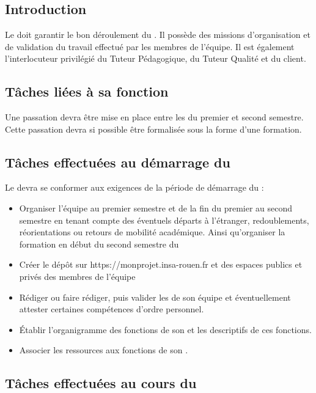 \section{\CP}
\subsection*{Introduction}

Le \CP doit garantir le bon déroulement du \PICCourt. Il possède des missions d’organisation et de validation du travail effectué par les membres de l’équipe. Il est également l’interlocuteur privilégié du Tuteur Pédagogique, du Tuteur Qualité et du client.

\subsection*{Tâches liées à sa fonction}

Une passation devra être mise en place entre les \CPs du premier et second semestre. Cette passation devra si possible être formalisée sous la forme d’une formation.

\subsection*{Tâches effectuées au démarrage du \PICCourt}

Le \CP devra se conformer aux exigences de la période de démarrage du \PICCourt :
\begin{itemize}
	\item Organiser l’équipe \PICCourt au premier semestre et de la fin du premier au second semestre en tenant compte des éventuels départs à l’étranger, redoublements, réorientations ou retours de mobilité académique. Ainsi qu’organiser la formation en début du second semestre du \PICCourt
	\item Créer le dépôt \git sur https://monprojet.insa-rouen.fr et des espaces publics et privés des membres de l’équipe \PICCourt
	\item Rédiger ou faire rédiger, puis valider les \FC de son équipe et éventuellement attester certaines compétences d’ordre personnel.
	\item Établir l’organigramme des fonctions de son \PICCourt et les descriptifs de ces fonctions.
	\item Associer les ressources aux fonctions de son \PICCourt.
\end{itemize}

\subsection*{Tâches effectuées au cours du \PICCourt}

